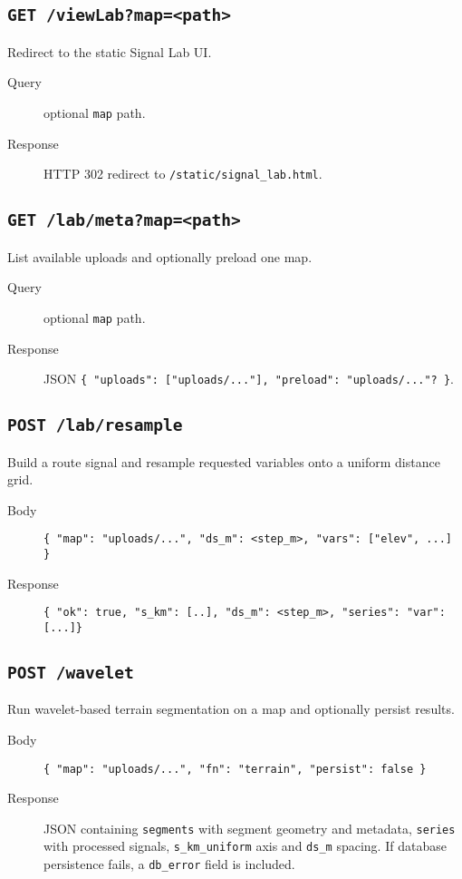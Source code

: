 \documentclass{article}
\begin{document}
\subsection{\texttt{GET /viewLab?map=<path>}}
Redirect to the static Signal Lab UI.
\begin{description}
\item[Query] optional \texttt{map} path.
\item[Response] HTTP 302 redirect to \texttt{/static/signal\_lab.html}.
\end{description}

\subsection{\texttt{GET /lab/meta?map=<path>}}
List available uploads and optionally preload one map.
\begin{description}
\item[Query] optional \texttt{map} path.
\item[Response] JSON \texttt{\{ "uploads": ["uploads/..."], "preload": "uploads/..."? \}}.
\end{description}

\subsection{\texttt{POST /lab/resample}}
Build a route signal and resample requested variables onto a uniform distance grid.
\begin{description}
\item[Body] \texttt{\{ "map": "uploads/...", "ds\_m": <step\_m>, "vars": ["elev", ...] \}}
\item[Response] \texttt{\{ "ok": true, "s\_km": [..], "ds\_m": <step\_m>, "series": {"var": [...]}\}}
\end{description}

\subsection{\texttt{POST /wavelet}}
Run wavelet-based terrain segmentation on a map and optionally persist results.
\begin{description}
\item[Body] \texttt{\{ "map": "uploads/...", "fn": "terrain", "persist": false \}}
\item[Response] JSON containing \texttt{segments} with segment geometry and metadata, \texttt{series} with processed signals, \texttt{s\_km\_uniform} axis and \texttt{ds\_m} spacing. If database persistence fails, a \texttt{db\_error} field is included.
\end{description}
\end{document}
